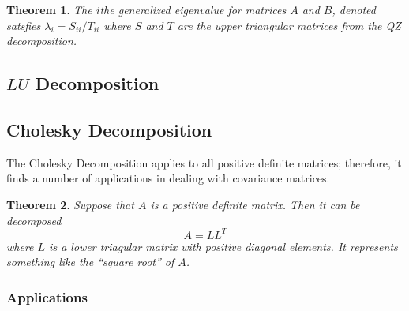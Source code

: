 \documentclass[12pt]{article}
\theoremstyle{plain}
\newtheorem{thm}{Theorem}[section]
\theoremstyle{definition}
\theoremstyle{remark}
\begin{document}
\begin{thm}
The $i$the generalized eigenvalue for matrices $A$ and $B$, denoted
satsfies $\lambda_i = S_{ii} / T_{ii}$ where $S$ and $T$ are the upper
triangular matrices from the QZ decomposition.
\end{thm}

\subsection{$LU$ Decomposition}

\subsection{Cholesky Decomposition}

The Cholesky Decomposition applies to all positive definite matrices;
therefore, it finds a number of applications in dealing with covariance
matrices.

\begin{thm}
Suppose that $A$ is a positive definite matrix. Then it
can be decomposed
\begin{equation}
  A = L L^T
\end{equation}
where $L$ is a lower triagular matrix with positive diagonal elements.
It represents something like the ``square root'' of $A$.
\end{thm}

\subsubsection{Applications}
\end{document}
